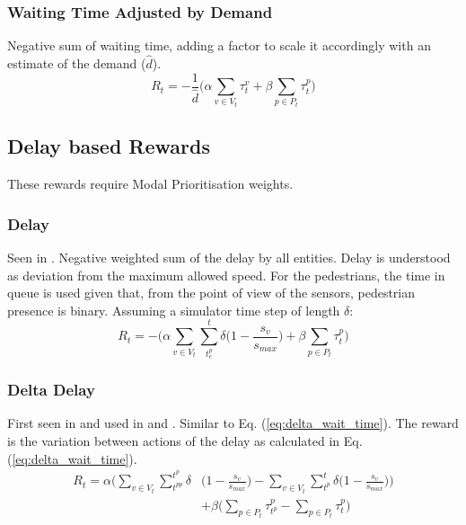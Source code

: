 \documentclass[conference]{IEEEtran}
\begin{document}
\subsubsection{Waiting Time Adjusted by Demand}
Negative sum of waiting time, adding a factor to scale it accordingly with an estimate of the demand ($\hat{d}$).
\begin{equation}
   R_t = -\frac{1}{\hat{d}} \bigg( \alpha \sum_{v \in V_t} \tau^v_{t} + \beta \sum_{p \in P_t} \tau^p_{t} \bigg)
\label{eq:wait_time_norm} 
\end{equation}

\subsection{Delay based Rewards}
These rewards require Modal Prioritisation weights.
\subsubsection{Delay}
Seen in \cite{wan2018}. Negative weighted sum of the delay by all entities. Delay is understood as deviation from the maximum allowed speed. 
For the pedestrians, the time in queue is used given that, from the point of view of the sensors, pedestrian presence is binary.
Assuming a simulator time step of length $\delta$:
\begin{equation}
    R_t = - \bigg( \alpha \sum_{v \in V_t}  \sum_{t^p_e}^t \delta \big( 1-\frac{s_v}{s_{max}} \big) + \beta \sum_{p \in P_t} \tau^p_t \bigg)
\label{eq:delay}
\end{equation}

\subsubsection{Delta Delay}
First seen in \cite{abdulhai2010} and used in \cite{mannion} \cite{genders2016} \cite{gao2017} \cite{mousavi2017} and \cite{gendersstate}.
Similar to Eq. (\ref{eq:delta_wait_time}).
The reward is the variation between actions of the delay as calculated in Eq. (\ref{eq:delta_wait_time}).
\begin{equation}
\begin{split}
R_t =  \alpha \bigg( \sum_{v \in V_t} \sum_{t^{pp}}^{t^p} \delta & \big( 1-\frac{s_v}{s_{max}} \big) - \sum_{v \in V_t}  \sum_{t^p}^t \delta \big( 1-\frac{s_v}{s_{max}} \big) \bigg) \\
& + \beta \bigg( \sum_{p \in P_t} \tau^p_{t^p} - \sum_{p \in P_t} \tau^p_{t} \bigg) 
\end{split}
\label{eq:changedelay} 
\end{equation}
\end{document}
